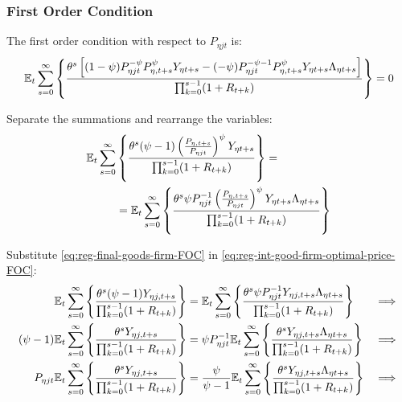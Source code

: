 \documentclass[
thesis.tex
]{subfiles}
\begin{document}

\subsubsection*{First Order Condition}

The first order condition with respect to $P_{\eta jt}$ is:
\begin{align}
	& \quad {\mathbb{E}_{t}} \sum_{s=0}^{\infty} \left\{ \frac{\theta^s \left[ (1-\psi) P_{\eta jt}^{-\psi} P_{\eta, t+s}^{\psi} Y_{\eta t+s} - (-\psi) P_{\eta jt}^{-\psi-1} P_{\eta, t+s}^{\psi} Y_{\eta t+s} \Lambda_{\eta t+s} \right] }{\prod_{k=0}^{s-1}(1+R_{t+k})} \right\} = 0 \nonumber
\end{align}


Separate the summations and rearrange the variables:
\begin{align}
	\begin{split}
		{\mathbb{E}_{t}} \sum_{s=0}^{\infty} &\left\{ \frac{\theta^s (\psi-1) \left( \frac{P_{\eta, t+s}} {P_{\eta jt}} \right)^{\psi} Y_{\eta t+s}} {\prod_{k=0}^{s-1} (1+R_{t+k})} \right\} = \\
		&= {\mathbb{E}_{t}} \sum_{s=0}^{\infty} \left\{ \frac{\theta^s \psi P_{\eta jt}^{-1} \left( \frac{P_{\eta, t+s}} {P_{\eta jt}} \right)^{\psi} Y_{\eta t+s} \Lambda_{\eta t+s} }{\prod_{k=0}^{s-1}(1+R_{t+k})} \right\} \label{eq:reg-int-good-firm-optimal-price-FOC}
	\end{split}
\end{align}


Substitute \ref{eq:reg-final-goods-firm-FOC} in \ref{eq:reg-int-good-firm-optimal-price-FOC}:
\begin{alignat}{2}
	{\mathbb{E}_{t}} \sum_{s=0}^{\infty} \Bigg\{ \frac{\theta^s (\psi-1) Y_{\eta j,t+s}}{\prod_{k=0}^{s-1}(1+R_{t+k})} \Bigg\} &= {\mathbb{E}_{t}} \sum_{s=0}^{\infty} \Bigg\{ \frac{\theta^s \psi P_{\eta jt}^{-1} Y_{\eta j,t+s} \Lambda_{\eta t+s}}{\prod_{k=0}^{s-1}(1+R_{t+k})}  \Bigg\} &\implies \nonumber \\
	(\psi-1) {\mathbb{E}_{t}} \sum_{s=0}^{\infty} \Bigg\{ \frac{\theta^s Y_{\eta j,t+s}}{\prod_{k=0}^{s-1}(1+R_{t+k})} \Bigg\} &= \psi P_{\eta jt}^{-1} {\mathbb{E}_{t}} \sum_{s=0}^{\infty} \Bigg\{ \frac{\theta^s Y_{\eta j,t+s} \Lambda_{\eta t+s}}{\prod_{k=0}^{s-1}(1+R_{t+k})}  \Bigg\} &\implies \nonumber \\
	P_{\eta jt} {\mathbb{E}_{t}} \sum_{s=0}^{\infty} \Bigg\{ \frac{\theta^s Y_{\eta j,t+s}}{\prod_{k=0}^{s-1}(1+R_{t+k})} \Bigg\} &= \frac{\psi}{\psi-1} {\mathbb{E}_{t}} \sum_{s=0}^{\infty} \Bigg\{ \frac{\theta^s Y_{\eta j,t+s} \Lambda_{\eta t+s}}{\prod_{k=0}^{s-1}(1+R_{t+k})}  \Bigg\} &\implies \nonumber
\end{alignat}
\end{document}
